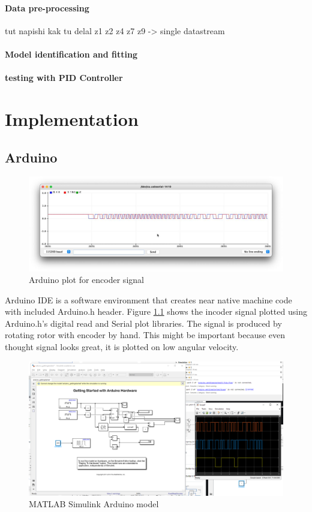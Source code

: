 \documentclass[]{final_report}
\begin{document}
\subsubsection{Data pre-processing}
tut napishi kak tu delal z1 z2 z4 z7 z9 -> single datastream

\subsubsection{Model identification and fitting}

\subsubsection{testing with PID Controller}

\chapter{Implementation}

\section{Arduino}

\begin{figure} [h!]
\centerline{\includegraphics[width=.75\textwidth]{Screenshots for paper/arduino/encoder signal.jpeg}}
\caption{Arduino plot for encoder signal}
\label{fig:arduinoEncoder}
\end{figure}

Arduino IDE is a software environment that creates near native machine code with included Arduino.h header. Figure \ref{fig:arduinoEncoder} shows the incoder signal plotted using Arduino.h's digital read and Serial plot libraries. The signal is produced by rotating rotor with encoder by hand. This might be important because even thought signal looks great, it is plotted on low angular velocity.

\begin{figure} [h!]
\centerline{\includegraphics[width=.75\textwidth]{Screenshots for paper/arduino/Model encoder arduin MATLAB.PNG}}
\caption{MATLAB Simulink Arduino model}
\label{fig:arduinoSimulink}
\end{figure}
\end{document}
